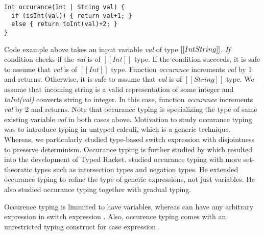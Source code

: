 \begin{lstlisting}[xleftmargin=.2\textwidth, xrightmargin=.2\textwidth]
Int occurance(Int | String val) {
  if (isInt(val)) { return val+1; }
  else { return toInt(val)+2; }
}
\end{lstlisting}

\noindent Code example above takes an input variable \emph{val}
of type $[[Int \/ String]]$. 
\emph{If} condition checks if the \emph{val} is of $[[Int]]$ type.
If the condition succeeds, it is safe to assume that \emph{val} is of $[[Int]]$ type.
Function \emph{occurance} increments \emph{val} by 1 and returns.
Otherwise, it is safe to assume that \emph{val} is of $[[String]]$ type.
We assume that incoming string is a valid representation of some integer
and \emph{toInt(val)} converts string to integer.
In this case, function \emph{occurance} increments \emph{val} by 2 and returns.
Note that occurance typing is specializing the type of
same existing variable \emph{val} in both cases above.
Motivation to study occurance typing was to introduce typing in untyped calculi,
which is a generic technique.
Whereas, we particularly studied type-based switch expression
with disjointness to preserve determinism.
Occurance typing is further studied by \cite{tobin2010logical}
which resulted into the development of Typed Racket.
\cite{castagna2019revisiting} studied occurance typing with more 
set-theoratic types such as intersection types and negation types.
He extended occurance typing to refine the type of
generic expressions, not just variables. He also studied occurance typing
together with gradual typing.


Occurence typing is limmited to have variables, whereas \cal
can have any arbitrary expression in switch expression
.
Also, occurence typing comes with an
unrestricted typing construct for case expression
.

